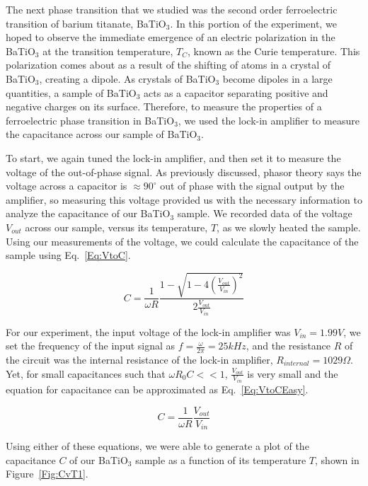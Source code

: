 \documentclass[%
 reprint,
 amsmath,amssymb,
 aps,
 pra,
]{revtex4-1}
\begin{document}
The next phase transition that we studied was the second order ferroelectric transition of barium titanate, BaTiO$_{3}$. In this portion of the experiment, we hoped to observe the immediate emergence of an electric polarization in the BaTiO$_{3}$ at the transition temperature, $T_{C}$, known as the Curie temperature. This polarization comes about as a result of the shifting of atoms in a crystal of BaTiO$_{3}$, creating a dipole. As crystals of BaTiO$_{3}$ become dipoles in a large quantities, a sample of BaTiO$_{3}$ acts as a capacitor separating positive and negative charges on its surface. Therefore, to measure the properties of a ferroelectric phase transition in BaTiO$_{3}$, we used the lock-in amplifier to measure the capacitance across our sample of BaTiO$_{3}$.

To start, we again tuned the lock-in amplifier, and then set it to measure the voltage of the out-of-phase signal. As previously discussed, phasor theory says the voltage across a capacitor is $\approx 90^\circ$ out of phase with the signal output by the amplifier, so measuring this voltage provided us with the necessary information to analyze the capacitance of our BaTiO$_{3}$ sample. We recorded data of the voltage $V_{out}$ across our sample, versus its temperature, $T$, as we slowly heated the sample. Using our measurements of the voltage, we could calculate the capacitance of the sample using Eq.~\ref{Eq:VtoC}.

\begin{equation}\label{Eq:VtoC}
C = \frac{1}{\omega R} \frac{1 - \sqrt{1 - 4(\frac{V_{out}}{V_{in}})^2 }}{2\frac{V_{out}}{V_{in}}}
\end{equation}

\noindent For our experiment, the input voltage of the lock-in amplifier was $V_{in} = 1.99V$, we set the frequency of the input signal as $f = \frac{\omega}{2\pi} = 25kHz$, and the resistance $R$ of the circuit was the internal resistance of the lock-in amplifier, $R_{internal} = 1029 \Omega$. Yet, for small capacitances such that $\omega R_{0} C << 1$, $\frac{V_{out}}{V_{in}}$ is very small and the equation for capacitance can be approximated as Eq.~\ref{Eq:VtoCEasy}. 

\begin{equation}\label{Eq:VtoCEasy}
C = \frac{1}{\omega R} \frac{V_{out}}{V_{in}}
\end{equation}

\noindent Using either of these equations, we were able to generate a plot of the capacitance $C$ of our BaTiO$_{3}$ sample as a function of its temperature $T$, shown in Figure~\ref{Fig:CvT1}.
\end{document}
